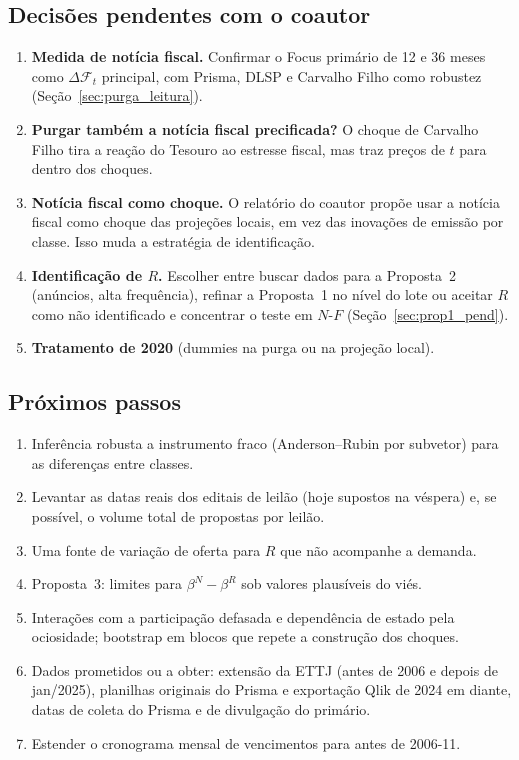 \documentclass[12pt,a4paper]{article}
\begin{document}
\subsection{Decisões pendentes com o coautor}\label{sec:decisoes}

\begin{enumerate}[leftmargin=1.2cm]
    \item \textbf{Medida de notícia fiscal.} Confirmar o Focus primário de 12 e 36
    meses como \(\Delta\mathcal{F}_t\) principal, com Prisma, DLSP e Carvalho Filho
    como robustez (Seção~\ref{sec:purga_leitura}).
    \item \textbf{Purgar também a notícia fiscal precificada?} O choque de Carvalho
    Filho tira a reação do Tesouro ao estresse fiscal, mas traz preços de \(t\) para
    dentro dos choques.
    \item \textbf{Notícia fiscal como choque.} O relatório do coautor propõe usar a
    notícia fiscal como choque das projeções locais, em vez das inovações de emissão
    por classe. Isso muda a estratégia de identificação.
    \item \textbf{Identificação de \(R\).} Escolher entre buscar dados para a
    Proposta~2 (anúncios, alta frequência), refinar a Proposta~1 no nível do lote ou
    aceitar \(R\) como não identificado e concentrar o teste em \(N\)-\(F\)
    (Seção~\ref{sec:prop1_pend}).
    \item \textbf{Tratamento de 2020} (dummies na purga ou na projeção local).
\end{enumerate}

\subsection{Próximos passos}\label{sec:proximos}

\begin{enumerate}[leftmargin=1.2cm]
    \item Inferência robusta a instrumento fraco (Anderson--Rubin por subvetor) para
    as diferenças entre classes.
    \item Levantar as datas reais dos editais de leilão (hoje supostos na véspera) e,
    se possível, o volume total de propostas por leilão.
    \item Uma fonte de variação de oferta para \(R\) que não acompanhe a demanda.
    \item Proposta~3: limites para \(\beta^N-\beta^R\) sob valores plausíveis do viés.
    \item Interações com a participação defasada e dependência de estado pela
    ociosidade; bootstrap em blocos que repete a construção dos choques.
    \item Dados prometidos ou a obter: extensão da ETTJ (antes de 2006 e depois de
    jan/2025), planilhas originais do Prisma e exportação Qlik de 2024 em diante,
    datas de coleta do Prisma e de divulgação do primário.
    \item Estender o cronograma mensal de vencimentos para antes de 2006-11.
\end{enumerate}
\end{document}
